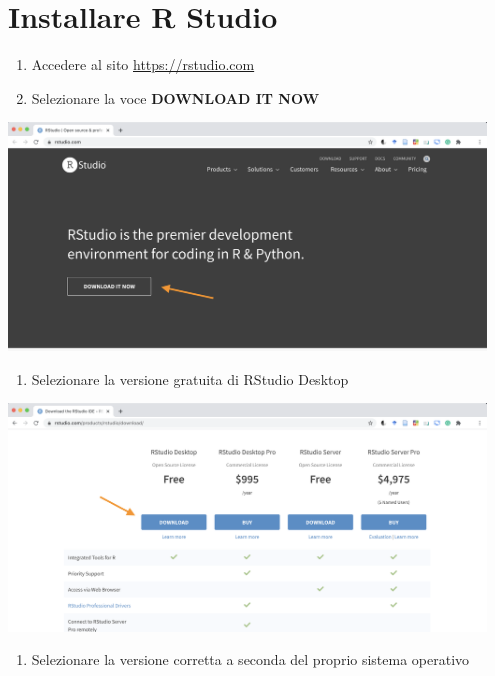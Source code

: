 \documentclass[
]{book}
\providecommand{\tightlist}{%
  \setlength{\itemsep}{0pt}\setlength{\parskip}{0pt}}
\begin{document}
\hypertarget{installare-r-studio}{%
\section{Installare R Studio}\label{installare-r-studio}}

\begin{enumerate}
\def\labelenumi{\arabic{enumi}.}
\tightlist
\item
  Accedere al sito \url{https://rstudio.com}
\item
  Selezionare la voce \textbf{DOWNLOAD IT NOW}
\end{enumerate}

\includegraphics[width=0.95\textwidth,height=\textheight]{images/install_rstudio1.png}

\begin{enumerate}
\def\labelenumi{\arabic{enumi}.}
\setcounter{enumi}{2}
\tightlist
\item
  Selezionare la versione gratuita di RStudio Desktop
\end{enumerate}

\includegraphics[width=0.95\textwidth,height=\textheight]{images/install_rstudio2.png}

\begin{enumerate}
\def\labelenumi{\arabic{enumi}.}
\setcounter{enumi}{3}
\tightlist
\item
  Selezionare la versione corretta a seconda del proprio sistema operativo
\end{enumerate}
\end{document}
